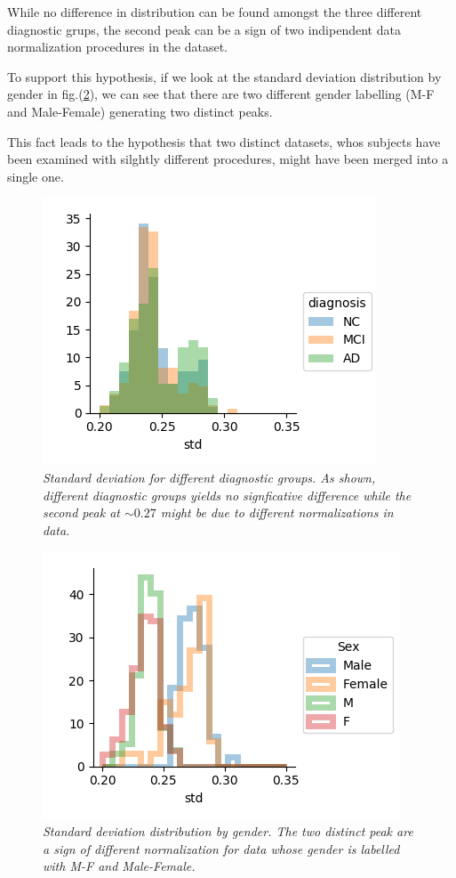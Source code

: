 \documentclass[12pt,openright,twoside,a4paper]{book}
\begin{document}
While no difference in distribution can be found amongst the three different diagnostic grups, the second peak can be a sign of two indipendent data normalization procedures in the dataset.

To support this hypothesis, if we look at the standard deviation distribution by gender in fig.(\ref{std-gen-ADNI}), we can see that there are two different gender labelling (M-F and Male-Female) generating two distinct peaks. 

This fact leads to the hypothesis that two distinct datasets, whos subjects have been examined with silghtly different procedures, might have been merged into a single one.

\begin{figure}[!h]
\centering
\includegraphics[scale=0.75]{std-ADNI}
\caption{\textit{Standard deviation for different diagnostic groups. As shown, different diagnostic groups yields no signficative difference while the second peak at $\sim 0.27$ might be due to different normalizations in data.}}
\label{std-ADNI}
\end{figure}

\begin{figure}[!h]
\centering
\includegraphics[scale=0.75]{ADNi-std-gen}
\caption{\textit{Standard deviation distribution by gender. The two distinct peak are a sign of different normalization for data whose gender is labelled with M-F and Male-Female.}}
\label{std-gen-ADNI}
\end{figure}
\end{document}
